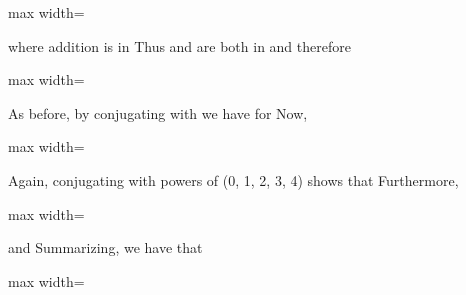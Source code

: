\documentclass[11pt,oneside]{article}
\begin{document}
\begin{BookBody}

\begin{center}\begin{adjustbox}{max width=\linewidth}\end{adjustbox}\end{center}

\noindent where addition is in  Thus  and  are both in  and therefore

\begin{center}\begin{adjustbox}{max width=\linewidth}\end{adjustbox}\end{center}

\noindent As before, by conjugating  with  we have  for  Now,

\begin{center}\begin{adjustbox}{max width=\linewidth}\end{adjustbox}\end{center}

\noindent Again, conjugating with powers of (0, 1, 2, 3, 4) shows that  Furthermore,

\begin{center}\begin{adjustbox}{max width=\linewidth}\end{adjustbox}\end{center}

\noindent and  Summarizing, we have that

\begin{center}\begin{adjustbox}{max width=\linewidth}\end{adjustbox}\end{center}


\end{BookBody}
\end{document}
